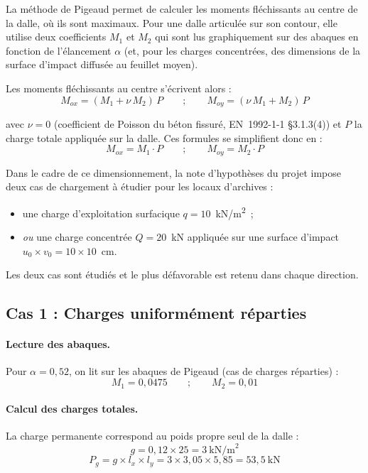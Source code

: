 La méthode de Pigeaud permet de calculer les moments fléchissants au centre de la dalle, où ils sont maximaux. Pour une dalle articulée sur son contour, elle utilise deux coefficients $M_1$ et $M_2$ qui sont lus graphiquement sur des abaques en fonction de l'élancement $\alpha$ (et, pour les charges concentrées, des dimensions de la surface d'impact diffusée au feuillet moyen).

Les moments fléchissants au centre s'écrivent alors :
\[
  M_{ox} = (M_1 + \nu\,M_2)\,P
  \qquad ; \qquad
  M_{oy} = (\nu\,M_1 + M_2)\,P
\]

avec $\nu = 0$ (coefficient de Poisson du béton fissuré, EN~1992-1-1 §3.1.3(4)) et $P$ la charge totale appliquée sur la dalle. Ces formules se simplifient donc en :
\[
  M_{ox} = M_1 \cdot P
  \qquad ; \qquad
  M_{oy} = M_2 \cdot P
\]

Dans le cadre de ce dimensionnement, la note d'hypothèses du projet impose deux cas de chargement à étudier pour les locaux d'archives :
\begin{itemize}
  \item une charge d'exploitation surfacique $q = 10$~kN/m\textsuperscript{2}~;
  \item \emph{ou} une charge concentrée $Q = 20$~kN appliquée sur une surface d'impact $u_0 \times v_0 = 10 \times 10$~cm.
\end{itemize}

Les deux cas sont étudiés et le plus défavorable est retenu dans chaque direction.

\subsection{Cas 1 : Charges uniformément réparties}

\paragraph{Lecture des abaques.} Pour $\alpha = 0{,}52$, on lit sur les abaques de Pigeaud (cas de charges réparties) :
\[
  M_1 = 0{,}0475 \qquad ; \qquad M_2 = 0{,}01
\]

\paragraph{Calcul des charges totales.} La charge permanente correspond au poids propre seul de la dalle :
\[
  g = 0{,}12 \times 25 = 3~\text{kN/m}^2
\]
\[
  P_g = g \times l_x \times l_y = 3 \times 3{,}05 \times 5{,}85 = 53{,}5~\text{kN}
\]

